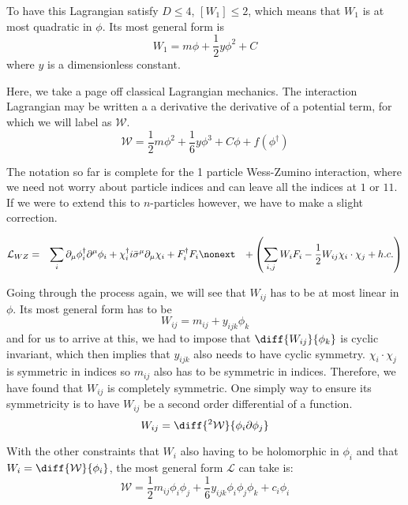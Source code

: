 To have this Lagrangian satisfy $D \leq 4$, $[W_1] \leq 2$, which means that $W_1$ is at most quadratic in $\phi$. Its most general form is
\begin{equation}
    W_1 = m \phi + \frac{1}{2} y \phi^2 + C
\end{equation}
where $y$ is a dimensionless constant.

Here, we take a page off classical Lagrangian mechanics. The interaction Lagrangian may be written a a derivative the derivative of a potential term, for which we will label as $\mathcal{W}$.
\begin{equation}
    \mathcal{W} = \frac{1}{2} m \phi^2 + \frac{1}{6}y \phi^3 + C\phi + f(\phi^\dagger)
\end{equation}

The notation so far is complete for the 1 particle Wess-Zumino interaction, where we need not worry about particle indices and can leave all the indices at $1$ or $11$. If we were to extend this to $n$-particles however, we have to make a slight correction.

\begin{eqnarray}
    \mathcal{L}_{WZ} &=& \sum_{i} \partial_\mu \phi^\dagger_i \partial^\mu \phi_i + \chi_i^\dagger i \Bar{\sigma}^\mu \partial_\mu \chi_i + F_i^\dagger F_i \nonext
    &&+ \left(\sum_{i,j} W_i F_i - \frac{1}{2} W_{ij}\chi_i\cdot\chi_j + h.c.\right)
    \label{eqn:8:wess-zumino lagrangian for n particles}
\end{eqnarray}

Going through the process again, we will see that $W_{ij}$ has to be at most linear in $\phi$. Its most general form has to be
\begin{equation}
    W_{ij} = m_{ij} + y_{ijk}\phi_k
\end{equation}
and for us to arrive at this, we had to impose that $\diff{W_{ij}}{\phi_k}$ is cyclic invariant, which then implies that $y_{ijk}$ also needs to have cyclic symmetry. $\chi_i\cdot\chi_j$ is symmetric in indices so $m_{ij}$ also has to be symmetric in indices. Therefore, we have found that $W_{ij}$ is completely symmetric. One simply way to ensure its symmetricity is to have $W_{ij}$ be a second order differential of a function.
\begin{equation}
    W_{ij} = \diff{^2\mathcal{W}}{\phi_i \partial\phi_j}
\end{equation}

With the other constraints that $W_i$ also having to be holomorphic in $\phi_i$ and that $W_i = \diff{\mathcal{W}}{\phi_i}$, the most general form $\mathcal{L}$ can take is:
\begin{equation}
    \mathcal{W} = \frac{1}{2}m_{ij}\phi_i \phi_j + \frac{1}{6}y_{ijk}\phi_i\phi_j\phi_k + c_i \phi_i
\end{equation}

